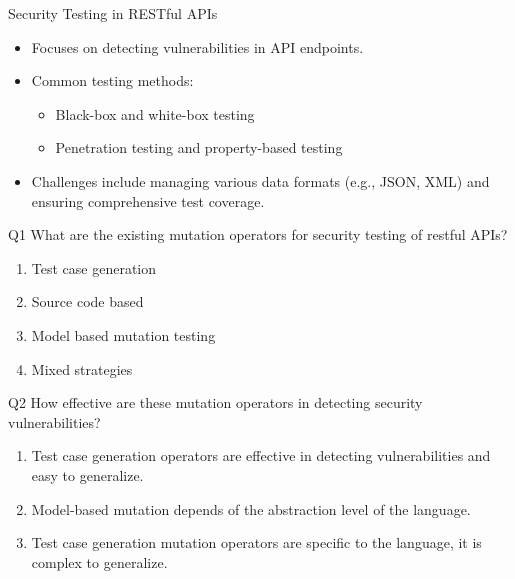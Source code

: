 \documentclass[12pt]{beamer}
\theoremstyle{remark}
\theoremstyle{definition}
\begin{document}
\begin{frame}[allowframebreaks]
\begin{block}{Security Testing in RESTful APIs}
\begin{itemize}
    \item Focuses on detecting vulnerabilities in API endpoints.
    \item Common testing methods:
    \begin{itemize}
        \item Black-box and white-box testing
        \item Penetration testing and property-based testing
    \end{itemize}
    \item Challenges include managing various data formats (e.g., JSON, XML) and ensuring comprehensive test coverage.
\end{itemize}
\end{block}
\pagebreak
\begin{block}{Q1}
     What are the existing mutation operators for security testing of restful APIs?
     \begin{enumerate}
      \item Test case generation
      \item Source code based
      \item Model based mutation testing
      \item Mixed strategies
  \end{enumerate}
\end{block}
\pagebreak
\begin{block}{Q2}
    How effective are these mutation operators in detecting security vulnerabilities?
  \begin{enumerate}
    \item Test case generation operators are effective in detecting vulnerabilities and easy to generalize.
    \item Model-based mutation depends of the abstraction level of the language.
    \item Test case generation mutation operators are specific to the language, it is complex to generalize.
  \end{enumerate}
\end{block}

\end{frame}
\end{document}
